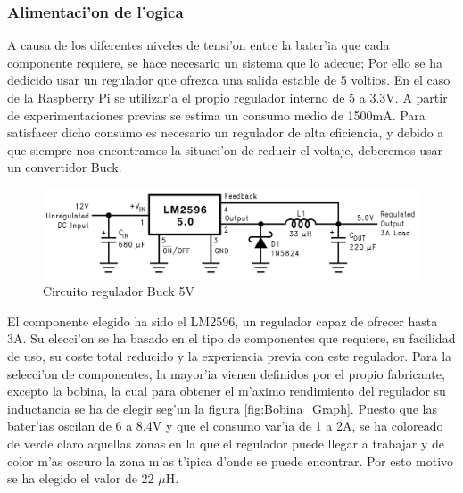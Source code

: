 \documentclass[twoside,12pt]{article}
\begin{document}
\subsubsection{Alimentaci'on de l'ogica}
A causa de los diferentes niveles de tensi'on entre la bater'ia que cada componente requiere, se hace necesario un sistema que lo adecue; Por ello se ha dedicido usar un regulador que ofrezca una salida estable de 5 voltios. En el caso de la Raspberry Pi se utilizar'a el propio regulador interno de 5 a 3.3V.
A partir de experimentaciones previas se estima un consumo medio de 1500mA. Para satisfacer dicho consumo es necesario un regulador de alta eficiencia, y debido a que siempre nos encontramos la situaci'on de reducir el voltaje, deberemos usar un convertidor Buck. 

\begin{figure}[ht]
\centering
\includegraphics[scale=0.35]{images/LM2596.png}
\caption{Circuito regulador Buck 5V}
\label{fig:LM2596}
\end{figure} 

El componente elegido ha sido el LM2596, un regulador capaz de ofrecer hasta 3A. Su elecci'on se ha basado en el tipo de componentes que requiere, su facilidad de uso, su coste total reducido y la experiencia previa con este regulador. Para la selecci'on de componentes, la mayor'ia vienen definidos por el propio fabricante, excepto la bobina, la  cual para obtener el m'aximo rendimiento del regulador su inductancia se ha de elegir seg'un la figura \ref{fig:Bobina_Graph}. Puesto que las bater'ias oscilan de 6 a 8.4V y que el consumo var'ia de 1 a 2A, se ha coloreado de verde claro aquellas zonas en la que el regulador puede llegar a trabajar y de color m'as oscuro la zona m'as t'ipica d'onde se puede encontrar. Por esto motivo se ha elegido el valor de 22 $\mu$H.
\end{document}
